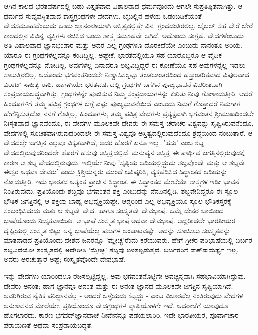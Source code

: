 ಆಗಿನ ಕಾಲದ ಭರತವರ್ಷದಲ್ಲಿ ಬಹು ವಿಸ್ತೃತವಾದ ವಿಶಾಲವಾದ ಧರ್ಮವೊಂದು ಆಗಲೇ ಸುಪ್ರತಿಷ್ಠಿತವಾಗಿತ್ತು. ಆ ಧರ್ಮದ ಸುವ್ಯವಸ್ಥಿತವಾದ ಶಾಸ್ತ್ರಗ್ರಂಥಗಳೇ ವೇದಗಳು. ಬೈಬಲ್ಲಿನ ಹಳೆಯ ಒಡಂಬಡಿಕೆಯಂತೆ ವೇದಸಮೂಹವೆಂಬುದು ಒಂದು ಜ್ಞಾನರಾಶಿಯಾಗಿ ಅಸ್ತಿತ್ವದಲ್ಲಿತ್ತೇ ವಿನಃ ಗ್ರಂಥದಂತಿರಲಿಲ್ಲ. ಬೈಬಲ್ ಸಹ ಬೇರೆ ಬೇರೆ ಕಾಲದಲ್ಲಿನ ವಿಭಿನ್ನ ವ್ಯಕ್ತಿಗಳು ರಚಿಸಿದ ಒಂದು ಶಾಸ್ತ್ರ ಸಮೂಹವೇ ಆಗಿದೆ. ಅದೊಂದು ಸಂಗ್ರಹ. ವೇದಗಳೆಂಬುದು ಅತಿ ವಿಶಾಲವಾದ ಜ್ಞಾನಭಂಡಾರ ಮತ್ತು ಅದರ ಎಲ್ಲ ಗ್ರಂಥಗಳೂ ದೊರಕಿದೆಯೇ ಎಂಬುದು ನಾನಂತೂ ಅರಿಯೆ. ಯಾರೂ ಈ ಗ್ರಂಥಗಳೆಲ್ಲವನ್ನೂ ಕಂಡಿದ್ದಿಲ್ಲ. ಅಷ್ಟೇಕೆ, ಭಾರತದಲ್ಲಿಯೂ ಸಹ ಯಾರೊಬ್ಬರೂ ಆ ವೈದಿಕ ಗ್ರಂಥಗಳೆಲ್ಲವನ್ನೂ ನೋಡಿಲ್ಲ. ಅವುಗಳೆಲ್ಲ ಏನಾದರೂ ಲಭ್ಯವಿದ್ದಿದ್ದರೆ ಈ ಕೋಣೆಯೂ ಸಹ ಅವುಗಳನ್ನೆಲ್ಲ ಇಡಲು ಸಾಲುತ್ತಿರಲಿಲ್ಲ. ಅದೊಂದು ಭಗವಂತನಿಂದಲೇ ನಿಃಶ್ವಾಸಿಸಲ್ಪಟ್ಟು ತಲತಲಾಂತರದಿಂದ ಹಸ್ತಾಂತರಿತವಾದ ವಿಪುಲವಾದ ವಿರಾಟ್ ಸಾಹಿತ್ಯ ರಾಶಿ. ಹಾಗಾಗಿಯೇ ಭರತವರ್ಷದಲ್ಲಿ ಗ್ರಂಥಗಳ ಬಗೆಗಿನ ಪೂಜ್ಯಭಾವನೆ ವಿಪರೀತವಾಗಿ ಸಂಪ್ರದಾಯಬದ್ಧವಾಗಿತ್ತು. ಗ್ರಂಥಗಳನ್ನೇ ಪೂಜಿಸುವ ನಿಮ್ಮ ಸಂಪ್ರದಾಯಗಳನ್ನು ಕುರಿತು ನೀವು ಗೋಳಾಡುತ್ತೀರಿ. ಆದರೆ ಹಿಂದೂಗಳಿಗೆ ತಮ್ಮ ಪವಿತ್ರ ಗ್ರಂಥಗಳ ಬಗ್ಗೆ ಎಷ್ಟು ಪೂಜ್ಯಭಾವನೆಯಿದೆ ಎಂಬುದು ನಿಮಗೆ ಗೊತ್ತಾದರೆ ನಿಮಗಾಗ ಹೇಗೆನ್ನಿಸುತ್ತದೋ ನನಗೆ ಗೊತ್ತಿಲ್ಲ. ಹಿಂದೂಗಳು, ತಮ್ಮ ಪವಿತ್ರ ವೇದಗಳು ಪ್ರತ್ಯಕ್ಷವಾಗಿ ಭಗವಂತನ ಶ‍್ರೀಮುಖದಿಂದಲೇ ನಿಃಸೃತವಾದ ಜ್ಞಾನವೆಂದೂ, ಈ ವೇದಗಳ ಮೂಲಕವೇ ದೇವರು ಈ ಸಮಸ್ತ ಚರಾಚರ ವಿಶ್ವವನ್ನು ಸೃಷ್ಟಿಸಿರುವನೆಂದೂ, ವೇದಗಳಲ್ಲಿ ಸೂಚಿತವಾಗಿರುವುದರಿಂದಲೇ ಈ ಸಮಸ್ತ ವಿಶ್ವವೂ ಅಸ್ತಿತ್ವದಲ್ಲಿರುವುದೆಂದೂ ಶ್ರದ್ಧೆಯಿಂದ ನಂಬುತ್ತಾರೆ. ಆ ವೇದದಲ್ಲೇ ಜಗತ್ತಿನ ಎಲ್ಲವೂ ವಿಕೃತವಾಗಿದೆ, ಅದರ ಹೊರಗೆ ಏನೂ ಇಲ್ಲ. 'ಹಸು' ಎಂಬ ಶಬ್ದ ವೇದದಲ್ಲಿರುವುದರಿಂದಲೇ ಹೊರಗೆ ಹಸುವು ಅಸ್ತಿತ್ವದಲ್ಲಿದೆ. ಮನುಷ್ಯನ ಅಸ್ತಿತ್ವ ಈ ಪಾರ್ಥಿವ ಜಗತ್ತಿನಲ್ಲಿರುವುದಕ್ಕೆ ಕಾರಣ ಆ ಶಬ್ದ ವೇದದಲ್ಲಿರುವುದು. ಇಲ್ಲಿಯೇ ನೀವು 'ಸೃಷ್ಟಿಯ ಆದಿಯಲ್ಲಿದ್ದುದು ಶಬ್ದವೊಂದೇ ಮತ್ತು ಆ ಶಬ್ದವೇ ಈಶ್ವರ ಅಥವಾ ದೇವರು' ಎಂದು ಕ್ರಿಶ್ಚಿಯನ್ನರು ಮುಂದೆ ಆವಿಷ್ಕರಿಸಿ, ವ್ಯಕ್ತಪಡಿಸಿದ ಸಿದ್ಧಾಂತದ ಆದಿಯನ್ನು ನೋಡುತ್ತೀರಿ. ಇದು ಭಾರತದ ಅತ್ಯಂತ ಪ್ರಾಚೀನ ಸಿದ್ಧಾಂತ. ಈ ಸಿದ್ಧಾಂತದ ಮೇಲೆಯೇ ಶಾಸ್ತ್ರಗಳ ಇಡೀ ಭಾವನೆ ನಿಂತಿರುವುದು. ಪ್ರತಿಯೊಂದು ಶಬ್ದವೂ ಭಗವಂತನ ಶಕ್ತಿ ಎಂಬುದನ್ನು ನೆನಪಿನಲ್ಲಿಡಿ. ಶಬ್ದವೇನಿದ್ದರೂ ಈ ಸ್ಥೂಲ ಭೌತಿಕ ಜಗತ್ತಿನಲ್ಲಿ ಆ ಶಕ್ತಿಯ ಬಾಹ್ಯ ಅಭಿವ್ಯಕ್ತಿಯಷ್ಟೇ. ಆದ್ದರಿಂದ ಎಲ್ಲ ಅಭಿವ್ಯಕ್ತಿಯೂ ಸ್ಥೂಲ ಭೌತಿಕಸ್ತರಕ್ಕೆ ಸಂಬಂಧಿಸಿದುದು ಮತ್ತು ಆ ಶಬ್ದವೇ ವೇದ. ಹಾಗೂ ಸಂಸ್ಕೃತವೇ ದೇವಭಾಷೆ. ಒಮ್ಮೆ ದೇವರ ಬಾಯಿಂದ ಭಾಷೆಯೊಂದು ನಿಃಸೃತವಾಯಿತು. ಆ ಭಾಷೆ ಸಂಸ್ಕೃತ ಭಾಷೆ ಅಥವಾ ದೇವಭಾಷೆ. ಆದ್ದರಿಂದಲೇ ಭಾರತೀಯರ ದೃಷ್ಟಿಯಲ್ಲಿ ಸಂಸ್ಕೃತ ಬಿಟ್ಟು ಅನ್ಯ ಭಾಷೆಯೆಲ್ಲ ಪಶುಗಳ ಅರಚಾಟವಷ್ಟೇ. ಅದನ್ನು ಸೂಚಿಸಲು ಸಂಸ್ಕೃತವನ್ನು ಮಾತನಾಡದ ಪ್ರತಿಯೊಂದು ದೇಶದ ಜನರನ್ನೂ 'ಮ್ಲೇಚ್ಛ'ರೆಂದು ಕರೆಯುವರು. ಹೇಗೆ ಗ್ರೀಕರ ಪರಿಭಾಷೆಯಲ್ಲಿ ಬರ್ಬರ ಶಬ್ದವಿದೆಯೋ ಸಂಸ್ಕೃತದಲ್ಲಿ ಅದೇರೀತಿ 'ಮ್ಲೇಚ್ಛ' ಶಬ್ದವು ಬಳಸಲ್ಪಡುತ್ತದೆ. ಬರ್ಬರರಿಗೆ ವಾಕ್‌ಸಾಮರ್ಥ್ಯ ಇಲ್ಲ. ಅವರು ಅರಚುತ್ತಾರೆ ಅಷ್ಟೆ; ಸಂಸ್ಕೃತವೊಂದೇ ದೇವಭಾಷೆ.

ಇನ್ನು ವೇದಗಳು ಯಾರಿಂದಲೂ ರಚಿಸಲ್ಪಟ್ಟಿದ್ದಲ್ಲ. ಅವು ಭಗವಂತನೊಟ್ಟಿಗೇ ಅವಚ್ಛಿನ್ನವಾಗಿ ಸಹಭಾವಿಯಾಗಿದ್ದುವು. ದೇವರು ಅನಂತ; ಹಾಗೆ ಜ್ಞಾನವೂ ಅನಂತ ಮತ್ತು ಈ ಅನಂತ ಜ್ಞಾನದ ಮೂಲಕವೇ ಜಗತ್ತಿನ ಸೃಷ್ಟಿಯಾಗಿದೆ. ಅವರಿಗಿರುವ ನೈತಿಕ ಪರಿಜ್ಞಾನವೆಲ್ಲ - ಅಂದರೆ ಒಳ್ಳೆಯದು ಕೆಟ್ಟದ್ದು - ಎಂಬ ವಿಚಾರವೆಲ್ಲ ನಿಂತಿರುವುದು ವೇದಗಳ ಅನುಶಾಸನದ ಮೇಲೆಯೇ. ಪ್ರತಿಯೊಂದೂ ವೇದಗ್ರಂಥಗಳ ವ್ಯಾಪ್ತಿಯೊಳಗೇ ಇದೆ. ಅದರಾಚೆಗೆ ಯಾವುದೂ ಹೊಗಲಾರದು. ಕಾರಣ ಭಗವದ್‌ಜ್ಞಾನದಾಚೆ ನೀವೇನನ್ನೂ ಪಡೆಯಲಾರಿರಿ. ಇದೇ ಭಾರತೀಯರ, ಪೂರ್ವಾಚಾರ ಪರಾಯಣತೆ ಅಥವಾ ಸಂಪ್ರದಾಯಬದ್ಧತೆ.

